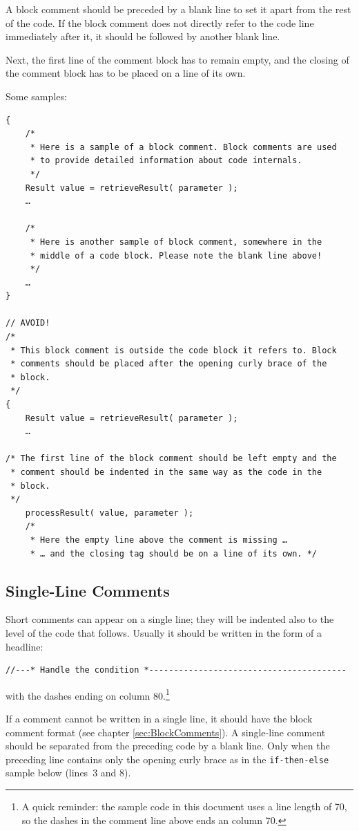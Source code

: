 \documentclass[11pt,a4paper, titlepage, parskip=half, headsepline, footsepline, cleardoublepage=current, headheight=1cm]{scrbook}
\newcommand*{\tqref}[1]{\hyperref[{#1}]{\ref*{#1}}}
\begin{document}
A block comment should be preceded by a blank line to set it apart from the rest of the code. If the block comment does not directly refer to the code line immediately after it, it should be followed by another blank line.

Next, the first line of the comment block has to remain empty, and the closing of the comment block has to be placed on a line of its own.

Some samples:
\begin{lstlisting}
{
    /*
     * Here is a sample of a block comment. Block comments are used
     * to provide detailed information about code internals.
     */
    Result value = retrieveResult( parameter );
    …

    /*
     * Here is another sample of block comment, somewhere in the
     * middle of a code block. Please note the blank line above!
     */
    …
}

// AVOID!
/*
 * This block comment is outside the code block it refers to. Block 
 * comments should be placed after the opening curly brace of the
 * block.
 */
{
    Result value = retrieveResult( parameter );
    …
 
/* The first line of the block comment should be left empty and the
 * comment should be indented in the same way as the code in the
 * block.
 */
    processResult( value, parameter );
    /* 
     * Here the empty line above the comment is missing …
     * … and the closing tag should be on a line of its own. */
\end{lstlisting}
 
\subsection{Single-Line Comments}\label{sec:SingleLineComments}
Short comments can appear on a single line; they will be indented also to the level of the code that follows. Usually it should be written in the form of a headline:
\begin{lstlisting}
//---* Handle the condition *----------------------------------------
\end{lstlisting}
with the dashes ending on column 80.\footnote{A quick reminder: the sample code in this document uses a line length of 70, so the dashes in the comment line above ends an column 70.}

If a comment cannot be written in a single line, it should have the block comment format (see chapter \tqref{sec:BlockComments}). A single-line comment should be separated from the preceding code by a blank line. Only when the preceding line contains only the opening curly brace as in the \lstinline|if-then-else| sample below (lines~3 and 8). 
\end{document}
